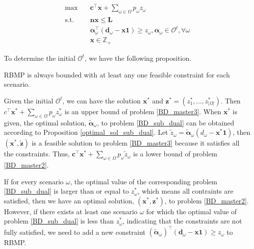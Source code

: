 \begin{equation}\label{BD_master3}
  \begin{aligned}
    \max \quad & \mathbf{c}^{\intercal} \mathbf{x} + \sum_{\omega \in \Omega} p_{\omega} z_{\omega} \\
    \text {s.t.} \quad & \mathbf{n} \mathbf{x} \leq \mathbf{L} \\
    & \bm{\alpha}_{\omega}^{\intercal}(\mathbf{d}_{\omega}- \mathbf{x} \mathbf{1}) \geq z_{\omega}, \bm{\alpha}_{\omega} \in \mathcal{O}^{t}, \forall \omega \\
     & \mathbf{x} \in \mathbb{Z}_{+}
  \end{aligned}
\end{equation}

To determine the initial $\mathcal{O}^{t}$, we have the following proposition.

\begin{prop}\label{one_ep_feasible}
RBMP is always bounded with at least any one feasible constraint for each scenario.
\end{prop}

Given the initial $\mathcal{O}^{t}$, we can have the solution $\mathbf{x}^{*}$ and $\mathbf{z}^{*} =(z^{*}_1,\ldots, z^{*}_{|\Omega|})$. Then $c^{\intercal} \mathbf{x}^{*} + \sum_{\omega \in \Omega} p_{\omega} z_{\omega}^{*}$ is an upper bound of problem \eqref{BD_master3}. When $\mathbf{x}^{*}$ is given, the optimal solution, $\bm{\tilde{\alpha}}_{\omega}$, to problem \eqref{BD_sub_dual} can be obtained according to Proposition \ref{optimal_sol_sub_dual}. Let $\tilde{z}_{\omega} = \bm{\tilde{\alpha}}_{\omega}(d_{\omega} - \mathbf{x}^{*} \mathbf{1})$, then $(\mathbf{x}^{*}, \mathbf{\tilde{z}})$ is a feasible solution to problem \eqref{BD_master3} because it satisfies all the constraints. Thus, $\mathbf{c}^{\intercal} \mathbf{x}^{*} + \sum_{\omega \in \Omega} p_{\omega} \tilde{z}_{\omega}$ is a lower bound of problem \eqref{BD_master2}.

If for every scenario $\omega$, the optimal value of the corresponding problem \eqref{BD_sub_dual} is larger than or equal to $z_{\omega}^{*}$, which means all contraints are satisfied, then we have an optimal solution, $(\mathbf{x}^{*}, \mathbf{z}^{*})$, to problem \eqref{BD_master2}. However, if there exists at least one scenario $\omega$ for which the optimal value of problem \eqref{BD_sub_dual} is less than $z_{\omega}^{*}$, indicating that the constraints are not fully satisfied, we need to add a new constraint $(\bm{\tilde{\alpha}}_{\omega})^{\intercal}(\mathbf{d}_{\omega} - \mathbf{x} \mathbf{1}) \geq z_{\omega}$ to RBMP.

